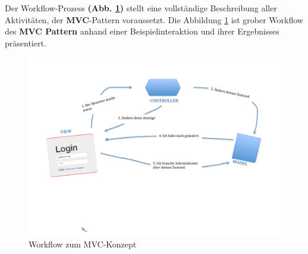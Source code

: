 Der Workflow-Prozess \textbf{(Abb. \ref{img:mvc})} stellt eine vollständige Beschreibung aller Aktivitäten, der \textbf{MVC}-Pattern voraussetzt. Die Abbildung \ref{img:mvc} ist grober Workflow des \textbf{MVC Pattern} anhand einer Beispielinteraktion und ihrer Ergebnisses präsentiert.
\begin{figure}[H]
\centering
\includegraphics[trim = 0mm 60mm 0mm 20mm, clip, width=1.0\textwidth]{resources/mvc}
\caption[Workflow zum MVC-Konzept]{Workflow zum MVC-Konzept}
\label{img:mvc}
\end{figure}

